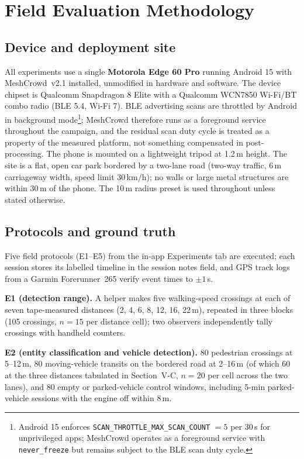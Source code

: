 \documentclass[journal,10pt]{IEEEtran}
\begin{document}
\section{Field Evaluation Methodology}
\label{sec:method}

\subsection{Device and deployment site}
All experiments use a single \textbf{Motorola Edge 60 Pro} running Android 15
with MeshCrowd~v2.1 installed, unmodified in hardware and software. The
device chipset is Qualcomm Snapdragon 8 Elite with a Qualcomm WCN7850
Wi-Fi/BT combo radio (BLE 5.4, Wi-Fi 7). BLE advertising scans are throttled
by Android in background mode\footnote{Android 15 enforces
\texttt{SCAN\_THROTTLE\_MAX\_SCAN\_COUNT} $=5$ per 30\,s for unprivileged
apps; MeshCrowd operates as a foreground service with
\texttt{never\_freeze} but remains subject to the BLE scan duty cycle.};
MeshCrowd therefore runs as a foreground service throughout the
campaign, and the residual scan duty cycle is treated as a property of the
measured platform, not something compensated in post-processing. The phone is
mounted on a lightweight tripod at 1.2\,m height. The site is a flat, open
car park bordered by a two-lane road (two-way traffic, 6\,m carriageway
width, speed limit 30\,km/h); no walls or large metal structures are within
30\,m of the phone. The 10\,m radius preset is used throughout unless stated
otherwise.

\subsection{Protocols and ground truth}
Five field protocols (E1--E5) from the in-app Experiments tab are executed;
each session stores its labelled timeline in the session notes field, and
GPS track logs from a Garmin Forerunner~265 verify event times to
$\pm1$\,s.

\textbf{E1 (detection range).} A helper makes five walking-speed crossings
at each of seven tape-measured distances (2, 4, 6, 8, 12, 16, 22\,m),
repeated in three blocks (105 crossings, $n=15$ per distance cell); two
observers independently tally crossings with handheld counters.

\textbf{E2 (entity classification and vehicle detection).} 80 pedestrian crossings
at 5--12\,m, 80 moving-vehicle transits on the bordered road at 2--16\,m
(of which 60 at the three distances tabulated in Section~V-C, $n=20$ per
cell across the two lanes), and 80 empty or parked-vehicle control windows,
including 5-min parked-vehicle sessions with the engine off within 8\,m.
\end{document}
